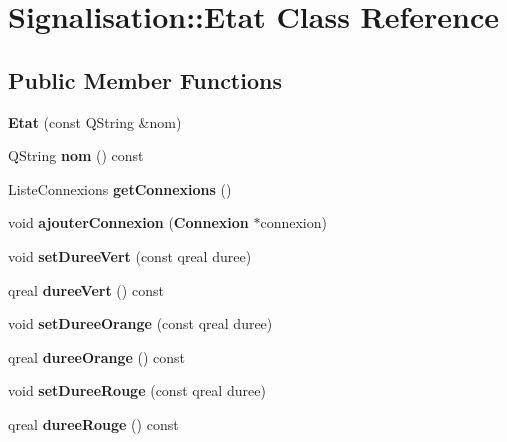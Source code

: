 \section{\-Signalisation\-:\-:\-Etat \-Class \-Reference}
\label{class_signalisation_1_1_etat}
\subsection*{\-Public \-Member \-Functions}
\begin{DoxyCompactItemize}
\item 
{\bfseries \-Etat} (const \-Q\-String \&nom)\label{class_signalisation_1_1_etat_aee974a70d58593641b323620b25d9d1b}

\item 
\-Q\-String {\bfseries nom} () const \label{class_signalisation_1_1_etat_adfed997bbeeed45cc4e4fd31ca6732cf}

\item 
\-Liste\-Connexions {\bfseries get\-Connexions} ()\label{class_signalisation_1_1_etat_aadfd9b3fb1052a4244d2a0903a9c1feb}

\item 
void {\bfseries ajouter\-Connexion} ({\bf \-Connexion} $\ast$connexion)\label{class_signalisation_1_1_etat_ab9e51e0f298e454068a07e9347e4cb20}

\item 
void {\bfseries set\-Duree\-Vert} (const qreal duree)\label{class_signalisation_1_1_etat_a07f59c512abd178b7808a7b7625f2833}

\item 
qreal {\bfseries duree\-Vert} () const \label{class_signalisation_1_1_etat_a7ccac09c10265553b0391e279fe7eff0}

\item 
void {\bfseries set\-Duree\-Orange} (const qreal duree)\label{class_signalisation_1_1_etat_a71edbb1ebd9c644c39f952f8de353ca1}

\item 
qreal {\bfseries duree\-Orange} () const \label{class_signalisation_1_1_etat_a1781d97d213f78adcc8f0512ba0cb8d0}

\item 
void {\bfseries set\-Duree\-Rouge} (const qreal duree)\label{class_signalisation_1_1_etat_a5a98d7a6d73d6a92686b69d656406649}

\item 
qreal {\bfseries duree\-Rouge} () const \label{class_signalisation_1_1_etat_a6888248f673d71f0bc71e32978cc839a}


\end{DoxyCompactItemize}
